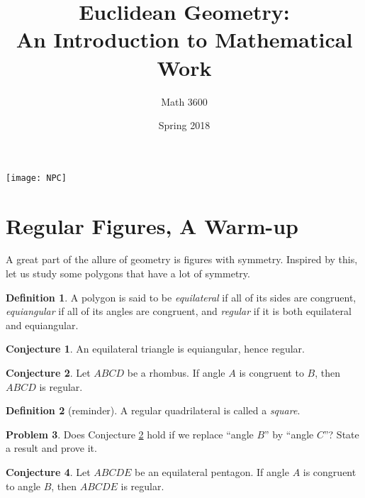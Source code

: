 \documentclass{tufte-handout}
\title{Euclidean Geometry:\\An Introduction to Mathematical Work}
\author[Math 3600]{Math 3600}
\date{Spring 2018}
\theoremstyle{definition}
\newtheorem{problem}{Problem}[section]
\newtheorem{conjecture}[problem]{Conjecture}
\newtheorem*{definition}{Definition}
\begin{document}
\maketitle

\begin{marginfigure}
    \texttt{[image: NPC]}
\end{marginfigure}

\setcounter{section}{6}
\section{Regular Figures, A Warm-up}

A great part of the allure of geometry is figures with symmetry. Inspired by this, let us study some polygons that have a lot of symmetry.

\begin{definition}\label{defn:regular}
A polygon is said to be \emph{equilateral} if all of its sides are congruent, \emph{equiangular} if all of its angles are congruent, and \emph{regular} if it is both equilateral and equiangular.
\end{definition}

\begin{conjecture}\label{conj:equilateral-triangle}
An equilateral triangle is equiangular, hence regular.
\end{conjecture}

\begin{conjecture}\label{conj:regular-rhombus}
Let $ABCD$ be a rhombus. If angle $A$ is congruent to $B$, then $ABCD$ is regular.
\end{conjecture}

\begin{definition}[reminder]\label{defn:square}
A regular quadrilateral is called a \emph{square}.
\end{definition}


\begin{problem}\label{prob:equilateral-quad}
Does Conjecture \ref{conj:regular-rhombus} hold if we replace ``angle $B$'' by ``angle $C$''? State a result and prove it.
\end{problem}

\begin{conjecture}\label{conj:equilateral-pentagon}
Let $ABCDE$ be an equilateral pentagon. If angle $A$ is congruent to angle $B$, then $ABCDE$ is regular.
\end{conjecture}
\end{document}
